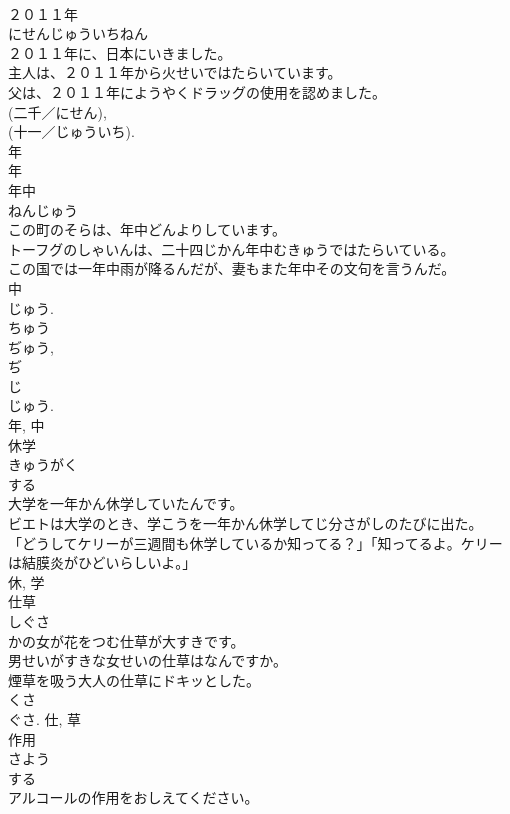 \documentclass[8pt]{extreport}
\begin{document}
\begin{CJK}{UTF8}{min}
\\	２０１１年	
\\	にせんじゅういちねん	
\\	２０１１年に、日本にいきました。	
\\	主人は、２０１１年から火せいではたらいています。	
\\	父は、２０１１年にようやくドラッグの使用を認めました。	
\\	(二千／にせん), 
\\	(十一／じゅういち). 
\\	年 
\\	年	
\\	年中	
\\	ねんじゅう	
\\	この町のそらは、年中どんよりしています。	
\\	トーフグのしゃいんは、二十四じかん年中むきゅうではたらいている。	
\\	この国では一年中雨が降るんだが、妻もまた年中その文句を言うんだ。	
\\	中 
\\	じゅう. 
\\	ちゅう 
\\	ぢゅう, 
\\	ぢ 
\\	じ 
\\	じゅう. 
\\	年, 中	
\\	休学	
\\	きゅうがく	
\\	する 
\\	大学を一年かん休学していたんです。	
\\	ビエトは大学のとき、学こうを一年かん休学してじ分さがしのたびに出た。	
\\	「どうしてケリーが三週間も休学しているか知ってる？」「知ってるよ。ケリーは結膜炎がひどいらしいよ。」	
\\	休, 学	
\\	仕草	
\\	しぐさ	
\\	かの女が花をつむ仕草が大すきです。	
\\	男せいがすきな女せいの仕草はなんですか。	
\\	煙草を吸う大人の仕草にドキッとした。	
\\	くさ 
\\	ぐさ.	仕, 草	
\\	作用	
\\	さよう	
\\	する 
\\	アルコールの作用をおしえてください。	

\end{CJK}
\end{document}
